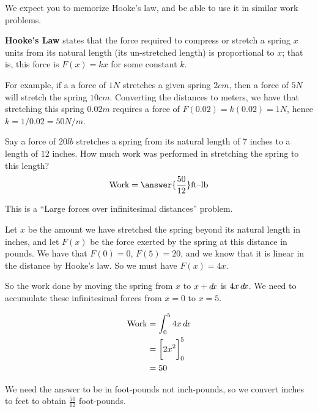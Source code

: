 \documentclass{ximera}
\begin{document}
\begin{example}
  \begin{warning}
    We expect you to memorize Hooke's law, and be able to use it in similar work problems.
  \end{warning}
  
  \textbf{Hooke's Law} states that the force required to compress or
  stretch a spring $x$ units from its natural length (its un-stretched
  length) is proportional to $x$; that is, this force is $F(x) = kx$
  for some constant $k$.

  For example, if a a force of $1\unit{N}$ stretches a given spring
  $2\unit{cm}$, then a force of $5\unit{N}$ will stretch the spring
  $10\unit{cm}$. Converting the distances to meters, we have that
  stretching this spring $0.02\unit{m}$ requires a force of $F(0.02) =
  k(0.02) = 1\unit{N}$, hence $k = 1/0.02 = 50\unit{N}/\unit{m}$.

  Say a force of $20\unit{lb}$ stretches a spring from its natural
  length of $7$ inches to a length of $12$ inches. How much work was
  performed in stretching the spring to this length?
  \[
  \textrm{Work} = \answer{\frac{50}{12}} \textrm{ft--lb}
  \]
  
  \begin{hint}
    This is a ``Large forces over infinitesimal distances'' problem.
  \end{hint}
  
  \begin{hint}
    Let $x$ be the amount we have stretched the spring beyond its
    natural length in inches, and let $F(x)$ be the force exerted by
    the spring at this distance in pounds.  We have that $F(0)=0$,
    $F(5) = 20$, and we know that it is linear in the distance by
    Hooke's law.  So we must have $F(x) = 4x$.
  \end{hint}
  
  \begin{hint}
    So the work done by moving the spring from $x$ to $x+\mathop{}\!d\! x$ is $4x
    \mathop{}\!d\! x$.  We need to accumulate these infinitesimal forces from
    $x=0$ to $x=5$.
  \end{hint}
  
  \begin{hint}
    \begin{align*}
      \textrm{Work} &= \int_0^5 4x \mathop{}\!d\! x\\
      &= \bigg[ 2x^2 \bigg]_0^5\\
      &=50
    \end{align*}
  \end{hint}
  
  \begin{hint}
    We need the answer to be in foot-pounds not inch-pounds, so we convert
    inches to feet to obtain $\frac{50}{12}$ foot-pounds.
  \end{hint}
  
\end{example}
\end{document}
